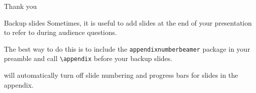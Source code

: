 \begin{frame}[standout]
  Thank you
\end{frame}

\appendix

\begin{frame}[fragile]{Backup slides}
  Sometimes, it is useful to add slides at the end of your presentation to
  refer to during audience questions.

  The best way to do this is to include the \verb|appendixnumberbeamer|
  package in your preamble and call \verb|\appendix| before your backup slides.

  \themename will automatically turn off slide numbering and progress bars for
  slides in the appendix.
\end{frame}




